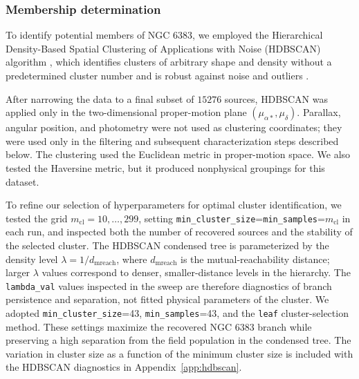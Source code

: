 \documentclass{aa}
\begin{document}
\subsubsection{Membership determination}\label{subsubsec:membership}

To identify potential members of NGC 6383, we employed the Hierarchical Density-Based Spatial Clustering of Applications with Noise (\textsc{HDBSCAN}) algorithm \citep{10.1007/978-3-642-37456-2_14,McInnes2017}, which identifies clusters of arbitrary shape and density without a predetermined cluster number and is robust against noise and outliers \citep{2021A&A...646A.104H}.

After narrowing the data to a final subset of $15276$ sources, \textsc{HDBSCAN} was applied only in the two-dimensional proper-motion plane $(\mu_{\alpha*},\mu_\delta)$. Parallax, angular position, and photometry were not used as clustering coordinates; they were used only in the filtering and subsequent characterization steps described below. The clustering used the Euclidean metric in proper-motion space. We also tested the Haversine metric, but it produced nonphysical groupings for this dataset.

To refine our selection of hyperparameters for optimal cluster identification, we tested the grid $m_{\mathrm{cl}}=10,\ldots,299$, setting \texttt{min\_cluster\_size}=\texttt{min\_samples}=$m_{\mathrm{cl}}$ in each run, and inspected both the number of recovered sources and the stability of the selected cluster. The \textsc{HDBSCAN} condensed tree is parameterized by the density level $\lambda=1/d_{\mathrm{mreach}}$, where $d_{\mathrm{mreach}}$ is the mutual-reachability distance; larger $\lambda$ values correspond to denser, smaller-distance levels in the hierarchy. The \texttt{lambda\_val} values inspected in the sweep are therefore diagnostics of branch persistence and separation, not fitted physical parameters of the cluster. We adopted \texttt{min\_cluster\_size}=43, \texttt{min\_samples}=43, and the \texttt{leaf} cluster-selection method. These settings maximize the recovered NGC 6383 branch while preserving a high separation from the field population in the condensed tree. The variation in cluster size as a function of the minimum cluster size is included with the HDBSCAN diagnostics in Appendix~\ref{app:hdbscan}.
\end{document}
